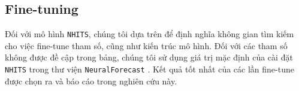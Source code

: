 \subsection{Fine-tuning}

Đối với mô hình \verb|NHITS|, chúng tôi dựa trên \cite{challu2023nhits} để định nghĩa không gian tìm kiếm cho việc fine-tune tham số, cũng như kiến trúc mô hình. Đối với các tham số không được đề cập trong bảng, chúng tôi sử dụng giá trị mặc định của cài đặt \verb|NHITS| trong thư viện \verb|NeuralForecast| \cite{neuralforecast}. Kết quả tốt nhất của các lần fine-tune được chọn ra và báo cáo trong nghiên cứu này.


\begin{table}[H]
    \centering
    \caption{Search space for fine-tuning NHITS.}
    \label{tab:nhits_finetune}
\end{table}


